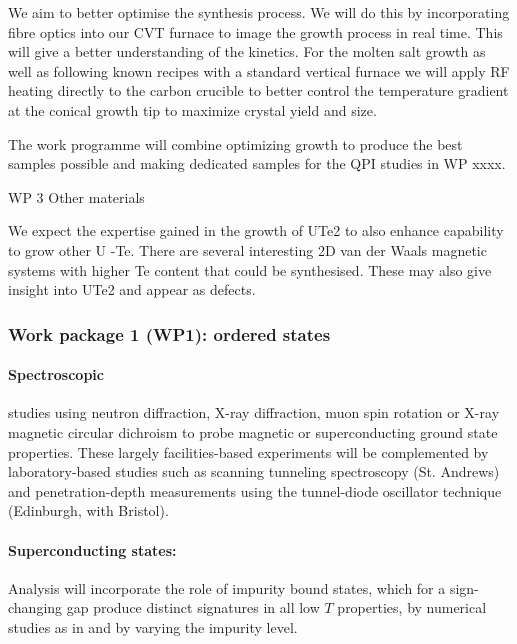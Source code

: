 We aim to better optimise the synthesis process. We will do this by incorporating fibre optics into our CVT furnace to image the growth process in real time. This will give a better understanding of the kinetics. For the molten salt growth as well as following known recipes with a standard vertical furnace we will apply RF heating directly to the carbon crucible to better control the temperature gradient at the conical growth tip to maximize crystal yield and size.

The work programme will combine optimizing growth to produce the best samples possible and making dedicated samples for the QPI studies in WP xxxx.

WP 3 Other materials

We expect the expertise gained in the growth of UTe2 to also enhance capability to grow other U -Te.  There are several interesting 2D van der Waals magnetic systems with higher Te content that could be synthesised. These may also give insight into UTe2 and appear as defects.

\subsubsection*{Work package 1 (WP1): ordered states}
\noindent
\paragraph{Spectroscopic} studies using neutron diffraction, X-ray diffraction, muon spin rotation or X-ray magnetic circular dichroism to probe magnetic or superconducting ground state properties. These largely facilities-based experiments will be complemented by laboratory-based studies such as scanning tunneling spectroscopy (St. Andrews) and penetration-depth measurements using the tunnel-diode oscillator technique (Edinburgh, with Bristol).

\paragraph{Superconducting states:}
Analysis will incorporate the role of impurity bound states, which for a sign-changing gap produce distinct signatures in  all low $T$ properties, by numerical studies as in \cite{bang17} and by varying the impurity level.

